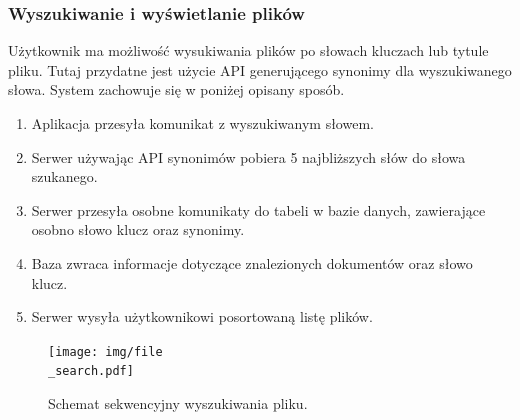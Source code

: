 \documentclass[12pt,a4paper,twoside]{article}
\begin{document}
\subsubsection*{Wyszukiwanie i wyświetlanie plików}
Użytkownik ma możliwość wysukiwania plików po słowach kluczach lub tytule pliku. Tutaj przydatne jest użycie API generującego synonimy dla wyszukiwanego słowa. System zachowuje się w poniżej opisany sposób.
\begin{enumerate}
	\item Aplikacja przesyła komunikat z wyszukiwanym słowem.
	\item Serwer używając API synonimów pobiera 5 najbliższych słów do słowa szukanego.
	\item Serwer przesyła osobne komunikaty do tabeli w bazie danych, zawierające osobno słowo klucz oraz synonimy.
	\item Baza zwraca informacje dotyczące znalezionych dokumentów oraz słowo klucz.
	\item Serwer wysyła użytkownikowi posortowaną listę plików.
\end{enumerate}
\begin{figure}[h!]
\centering
  \texttt{[image: img/file\\\_search.pdf]}
  \caption{Schemat sekwencyjny wyszukiwania pliku.}
\end{figure}
\end{document}
